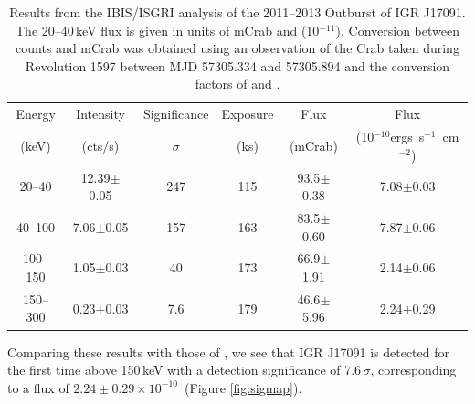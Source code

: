 \begin{table}
\begin{tabular}{cccccc}
\hline
\hline
Energy 		& Intensity 		& Significance 	& Exposure 	& Flux 				& Flux					\\
(keV)		& (cts/s)			& $\sigma$		& (ks)		& (mCrab) 			& (10$^{-10}$ergs~s$^{-1}$~cm$^{-2}$) 	\\
\hline
20--40		& 12.39$\pm$0.05	& 247			& 115		& 93.5$\pm$0.38		& 7.08$\pm$0.03			\\
40--100		& 7.06$\pm$0.05		& 157			& 163		& 83.5$\pm$0.60		& 7.87$\pm$0.06			\\
100--150	& 1.05$\pm$0.03		& 40			& 173		& 66.9$\pm$1.91		& 2.14$\pm$0.06			\\
150--300	& 0.23$\pm$0.03		& 7.6			& 179		& 46.6$\pm$5.96		& 2.24$\pm$0.29			\\	
\hline
\hline
\end{tabular}
\caption[Results from the IBIS/ISGRI analysis of the 2011--2013 Outburst of IGR J17091.]{Results from the \indexibis IBIS/ISGRI analysis of the 2011--2013 Outburst of IGR J17091. The 20--40\,keV flux is given in units of mCrab and (10$^{-11}$\ergf ). Conversion between counts and mCrab was obtained using an observation of the Crab taken during Revolution 1597 between MJD 57305.334 and 57305.894 and the conversion factors of \citet{Bird_Survey} and \citet{Bazzano_Survey}.}
\label{tab:IBIS_results}
\end{table}

\par Comparing these results with those of \citet{Bazzano_Survey}, we see that IGR J17091 is detected for the first time above 150\,keV with a detection significance of 7.6\,$\sigma$, corresponding to a flux of $2.24\pm0.29\times10^{-10}$\ergf\ (Figure \ref{fig:sigmap}).

